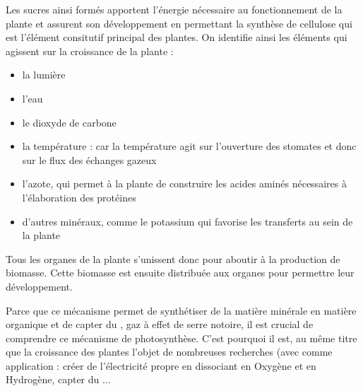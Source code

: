 Les sucres ainsi formés apportent l'énergie nécessaire au fonctionnement de la plante et assurent son développement en permettant la synthèse de cellulose qui est l'élément consitutif principal des plantes.
On identifie ainsi les éléments qui agissent sur la croissance de la plante : 
\begin{itemize}
	\item la lumière
	\item l'eau
	\item le dioxyde de carbone
	\item la température : car la température agit sur l'ouverture des stomates et donc sur le flux des échanges gazeux
	\item l'azote, qui permet à la plante de construire les acides aminés nécessaires à l'élaboration des protéines
	\item d'autres minéraux, comme le potassium qui favorise les transferts au sein de la plante
\end{itemize}

Tous les organes de la plante s'unissent donc pour aboutir à la production de biomasse. Cette biomasse est ensuite distribuée aux organes pour permettre leur développement.

Parce que ce mécanisme permet de synthétiser de la matière minérale en matière organique et de capter du , gaz à effet de serre notoire, il est crucial de comprendre ce mécanisme de photosynthèse. C'est pourquoi il est, au même titre que la croissance des plantes l'objet de nombreuses recherches (avec comme application : créer de l'électricité propre en dissociant  en Oxygène et en Hydrogène, capter du ...

